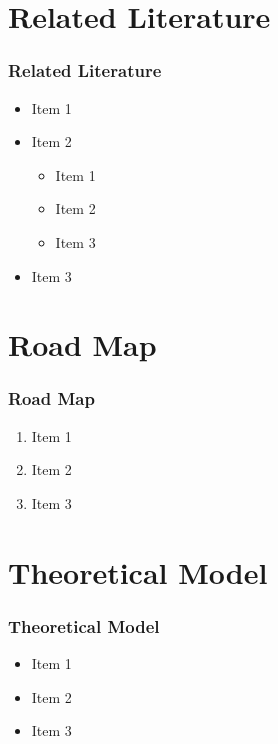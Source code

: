 \documentclass[11pt]{beamer}
\begin{document}
\section{Related Literature}
\begin{frame}
	\frametitle{\textbf{Related Literature}}
	
	\begin{itemize}
		\item Item 1
		\item Item 2
		\begin{itemize}
			\item Item 1 
			\item Item 2
			\item Item 3
		\end{itemize}
		\item Item 3
	\end{itemize}
\end{frame}

\section{Road Map}
\begin{frame}
	\frametitle{\textbf{Road Map}}
	
	\begin{enumerate}
	\item Item 1
	\item Item 2
	\item Item 3
	\end{enumerate}

\end{frame}

\section{Theoretical Model}	
\begin{frame}
	\frametitle{\textbf{Theoretical Model}}
	
		\begin{itemize}
		\item Item 1
		\item Item 2
		\item Item 3
	\end{itemize}
\end{frame}
\end{document}
